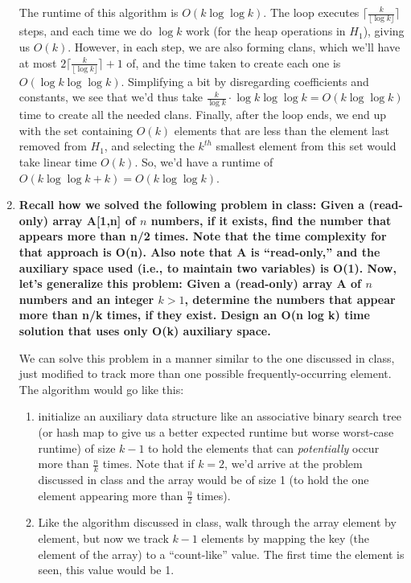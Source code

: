 \documentclass[12pt]{article}
\begin{document}
\begin{enumerate}
    The runtime of this algorithm is $O(k\log\log k)$. The loop executes $\lceil \frac{k}{\lfloor \log k \rfloor} \rceil$ 
    steps, and each time we do $\log k$ work (for the heap operations in $H_1$), giving us $O(k)$. However, in each step, 
    we are also forming clans, which we'll have at most $2\lceil \frac{k}{\lfloor \log k \rfloor} \rceil + 1$ of, and 
    the time taken to create each one is $O(\log k \log\log k)$. Simplifying a bit by disregarding coefficients and 
    constants, we see that we'd thus take $\frac{k}{\log k} \cdot \log k \log\log k = O(k \log\log k)$ time to create 
    all the needed clans. Finally, after the loop ends, we end up with the set containing $O(k)$ elements that are less 
    than the element last removed from $H_1$, and selecting the $k^{th}$ smallest element from this set would take 
    linear time $O(k)$. So, we'd have a runtime of $O(k \log\log k + k) = O(k \log\log k)$.

    \item \textbf{Recall how we solved the following problem in class: Given a (read-only) 
    array A[1,n] of $n$ numbers, if it exists, find the number that appears more than n/2 
    times. Note that the time complexity for that approach is O(n). Also 
    note that A is ``read-only,'' and the auxiliary space used (i.e., to maintain two variables) 
    is O(1). Now, let's generalize this problem: Given a (read-only) array A of $n$ numbers and 
    an integer $k > 1$, determine the numbers that appear more than n/k times, if they exist. 
    Design an O(n log k) time solution that uses only O(k) auxiliary space.}

    We can solve this problem in a manner similar to the one discussed in class, just modified to 
    track more than one possible frequently-occurring element. The algorithm would go like this:

    \begin{enumerate}
        \item initialize an auxiliary data structure like an associative binary search tree (or hash map to give us 
        a better expected runtime but worse worst-case runtime) of size $k - 1$ to hold the elements that can 
        \textit{potentially} occur more than $\frac{n}{k}$ times. Note that if $k = 2$, we'd 
        arrive at the problem discussed in class and the array would be of size 1 (to hold the 
        one element appearing more than $\frac{n}{2}$ times).
        
        \item Like the algorithm discussed in class, walk through the array element by element, 
        but now we track $k - 1$ elements by mapping the key (the element of the array) to a ``count-like'' value. 
        The first time the element is seen, this value would be 1.
        

\end{enumerate}
\end{enumerate}
\end{document}
